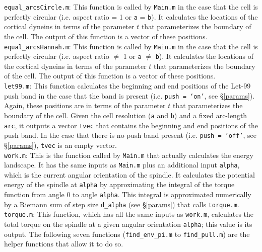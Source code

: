 \documentclass{article}
\begin{document}
\noindent\texttt{equal\_arcsCircle.m}: This function is called by \texttt{Main.m} in the case that the cell is perfectly circular (i.e. aspect ratio = 1 or \texttt{a} = \texttt{b}). It calculates the locations of the cortical dyneins in terms of the parameter $t$ that parameterizes the boundary of the cell. The output of this function is a vector of these positions.
\\[3pt]

\noindent\texttt{equal\_arcsHannah.m}: This function is called by \texttt{Main.m} in the case that the cell is perfectly circular (i.e. aspect ratio $\ne$ 1 or \texttt{a} $\ne$ \texttt{b}). It calculates the locations of the cortical dyneins in terms of the parameter $t$ that parameterizes the boundary of the cell. The output of this function is a vector of these positions.
\\[3pt]

\noindent\texttt{let99.m}: This function calculates the beginning and end positions of the Let-99 push band in the case that the band is present (i.e. \texttt{push = `on'}, see \S\ref{params}). Again, these positions are in terms of the parameter $t$ that parameterizes the boundary of the cell. Given the cell resolution (\texttt{a} and \texttt{b}) and a fixed arc-length \texttt{arc}, it outputs a vector \texttt{tvec} that contains the beginning and end positions of the push band. In the case that there is no push band present (i.e. \texttt{push = `off'}, see \S\ref{params}), \texttt{tvec} is an empty vector.
\\[3pt]

\noindent\texttt{work.m}: This is the function called by \texttt{Main.m} that actually calculates the energy landscape. It has the same inputs as \texttt{Main.m} plus an additional input \texttt{alpha}, which is the current angular orientation of the spindle. It calculates the potential energy of the spindle at \texttt{alpha} by approximating the integral of the torque function from angle 0 to angle \texttt{alpha}. This integral is approximated numerically by a Riemann sum of step size \texttt{d\_alpha} (see \S\ref{params}) that calls \texttt{torque.m}.
\\[3pt]

\noindent\texttt{torque.m}: This function, which has all the same inputs as \texttt{work.m}, calculates the total torque on the spindle at a given angular orientation \texttt{alpha}; this value is its output. The following seven functions (\texttt{find\_env\_pi.m} to \texttt{find\_pull.m}) are the helper functions that allow it to do so. 
\\[3pt]
\end{document}
